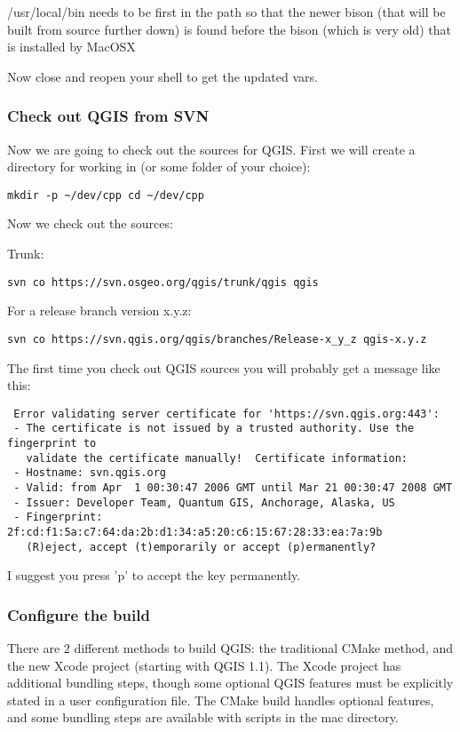 /usr/local/bin needs to be first in the path so that the newer bison (that will
be built from source further down) is found before the bison (which is very
old) that is installed by MacOSX

Now close and reopen your shell to get the updated vars.

\subsubsection{Check out QGIS from SVN}
Now we are going to check out the sources for QGIS. First we will create a
directory for working in (or some folder of your choice):

\begin{verbatim}
mkdir -p ~/dev/cpp cd ~/dev/cpp 
\end{verbatim}

Now we check out the sources:

Trunk:

\begin{verbatim}
svn co https://svn.osgeo.org/qgis/trunk/qgis qgis 
\end{verbatim}

For a release branch version x.y.z:

\begin{verbatim}
svn co https://svn.qgis.org/qgis/branches/Release-x_y_z qgis-x.y.z
\end{verbatim}

The first time you check out QGIS sources you will probably get a message like
this:

\begin{verbatim}
 Error validating server certificate for 'https://svn.qgis.org:443':
 - The certificate is not issued by a trusted authority. Use the fingerprint to
   validate the certificate manually!  Certificate information:
 - Hostname: svn.qgis.org
 - Valid: from Apr  1 00:30:47 2006 GMT until Mar 21 00:30:47 2008 GMT
 - Issuer: Developer Team, Quantum GIS, Anchorage, Alaska, US
 - Fingerprint: 2f:cd:f1:5a:c7:64:da:2b:d1:34:a5:20:c6:15:67:28:33:ea:7a:9b
   (R)eject, accept (t)emporarily or accept (p)ermanently?  
\end{verbatim}

I suggest you press 'p' to accept the key permanently.

\subsubsection{Configure the build}
There are 2 different methods to build QGIS: the traditional CMake method,
and the new Xcode project (starting with QGIS 1.1). The Xcode project has
additional bundling steps, though some optional QGIS features must be explicitly
stated in a user configuration file. The CMake build handles optional features,
and some bundling steps are available with scripts in the mac directory.

